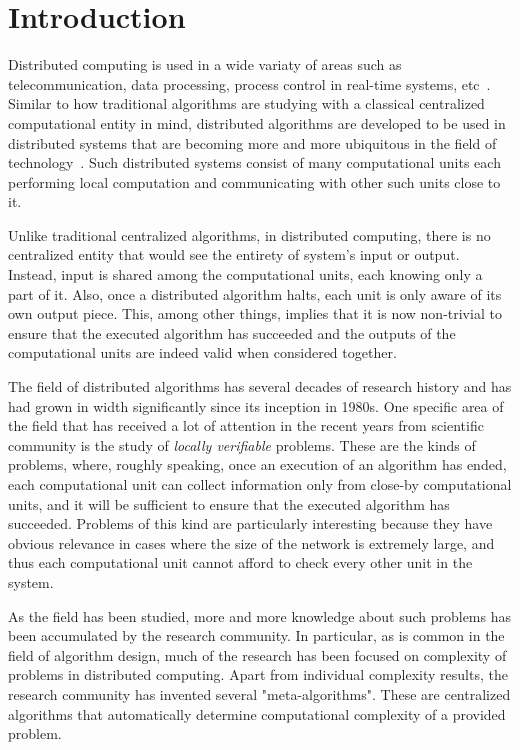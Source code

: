 \chapter{Introduction}
\label{chapter:intro}

Distributed computing is used in a wide variaty of areas
such as telecommunication, data processing, process control in real-time systems, etc~\cite{Lynch1996}. Similar to
how traditional algorithms are studying with a classical
centralized computational entity in mind, distributed
algorithms are developed to be used in distributed
systems that are becoming more and more ubiquitous in the
field of technology~\cite{Attiya2004}. Such distributed
systems consist of many computational units each
performing local computation and communicating
with other such units close to it.

Unlike traditional
centralized algorithms, in distributed computing,
there is no centralized entity that would see the
entirety of system's input or output. Instead,
input is shared among the computational units, each
knowing only a part of it. Also, once a distributed
algorithm halts, each unit is only aware of its
own output piece. This, among other things, implies
that it is now non-trivial to ensure that the
executed algorithm has succeeded and the
outputs of the computational units are
indeed valid when considered together.

The field of distributed algorithms has several
decades of research history and has had grown
in width significantly since its inception in 1980s.
One specific
area of the field that has received a lot of
attention in the recent years from scientific
community is the study of \emph{locally verifiable}
problems.
These are the kinds of problems, where, roughly speaking,
once an execution of an algorithm has ended, each
computational unit can
collect information only from close-by computational units,
and it will be sufficient to ensure that the executed algorithm has succeeded. Problems of this kind are particularly
interesting because they have obvious relevance
in cases where the size of the network is extremely
large, and thus each computational unit
cannot afford to check every other unit in the system.

As the field has been studied, more and more knowledge
about such problems has been accumulated by the
research community. In particular, as is common
in the field of algorithm design, much of the
research has been focused on complexity of
problems in distributed computing. Apart from
individual complexity results, the research
community has invented several "meta-algorithms".
These are centralized algorithms that
automatically determine
computational complexity of a provided
problem.

